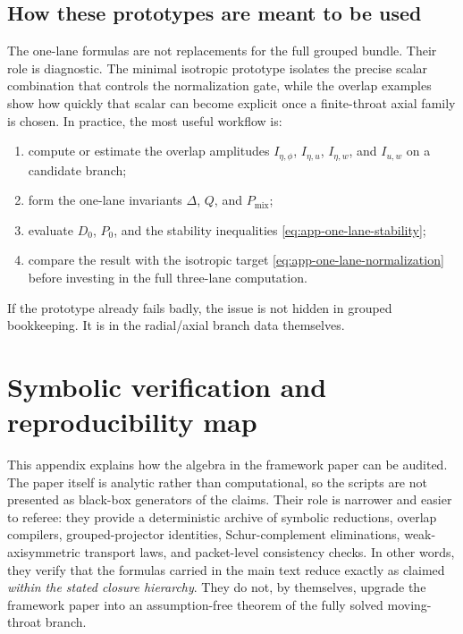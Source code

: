 \documentclass[11pt]{article}
\theoremstyle{definition}
\begin{document}
\subsection{How these prototypes are meant to be used}

The one-lane formulas are not replacements for the full grouped bundle. Their role is diagnostic. The minimal isotropic prototype isolates the precise scalar combination that controls the normalization gate, while the overlap examples show how quickly that scalar can become explicit once a finite-throat axial family is chosen. In practice, the most useful workflow is:
\begin{enumerate}
    \item compute or estimate the overlap amplitudes $I_{\eta,\phi}$, $I_{\eta,u}$, $I_{\eta,w}$, and $I_{u,w}$ on a candidate branch;
    \item form the one-lane invariants $\Delta$, $Q$, and $P_{\mathrm{mix}}$;
    \item evaluate $D_0$, $P_0$, and the stability inequalities \eqref{eq:app-one-lane-stability};
    \item compare the result with the isotropic target \eqref{eq:app-one-lane-normalization} before investing in the full three-lane computation.
\end{enumerate}
If the prototype already fails badly, the issue is not hidden in grouped bookkeeping. It is in the radial/axial branch data themselves.

\section{Symbolic verification and reproducibility map}
\label{app:verification-map}

This appendix explains how the algebra in the framework paper can be audited. The paper itself is analytic rather than computational, so the scripts are not presented as black-box generators of the claims. Their role is narrower and easier to referee: they provide a deterministic archive of symbolic reductions, overlap compilers, grouped-projector identities, Schur-complement eliminations, weak-axisymmetric transport laws, and packet-level consistency checks. In other words, they verify that the formulas carried in the main text reduce exactly as claimed \emph{within the stated closure hierarchy}. They do not, by themselves, upgrade the framework paper into an assumption-free theorem of the fully solved moving-throat branch.
\end{document}
